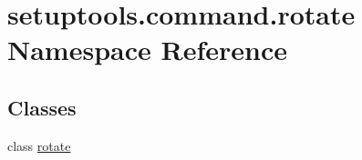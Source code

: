 \hypertarget{namespacesetuptools_1_1command_1_1rotate}{}\section{setuptools.\+command.\+rotate Namespace Reference}
\label{namespacesetuptools_1_1command_1_1rotate}
\subsection*{Classes}
\begin{DoxyCompactItemize}
\item 
class \hyperlink{classsetuptools_1_1command_1_1rotate_1_1rotate}{rotate}
\end{DoxyCompactItemize}
